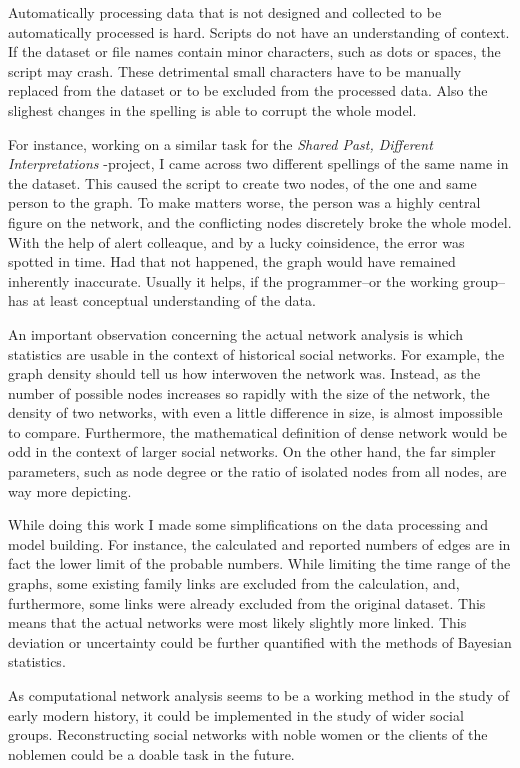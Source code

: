 Automatically processing data that is not designed and collected to be automatically processed is hard. Scripts do not have an understanding of context. If the dataset or file names contain minor characters, such as dots or spaces, the script may crash. These detrimental small characters have to be manually replaced from the dataset or to be excluded from the processed data. Also the slighest changes in the spelling is able to corrupt the whole model.

For instance, working on a similar task for the \textit{Shared Past, Different Interpretations} -project, I came across two different spellings of the same name in the dataset. This caused the script to create two nodes, of the one and same person to the graph. To make matters worse, the person was a highly central figure on the network, and the conflicting nodes discretely broke the whole model. With the help of alert colleaque, and by a lucky coinsidence, the error was spotted in time. Had that not happened, the graph would have remained inherently inaccurate. Usually it helps, if the programmer–or the working group–has at least conceptual understanding of the data. 

An important observation concerning the actual network analysis is which statistics are usable in the context of historical social networks. For example, the graph density should tell us how interwoven the network was. Instead, as the number of possible nodes increases so rapidly with the size of the network, the density of two networks, with even a little difference in size, is almost impossible to compare. Furthermore, the mathematical definition of dense network would be odd in the context of larger social networks. On the other hand, the far simpler parameters, such as node degree or the ratio of isolated nodes from all nodes, are way more depicting. 

While doing this work I made some simplifications on the data processing and model building. For instance, the calculated and reported numbers of edges are in fact the lower limit of the probable numbers. While limiting the time range of the graphs, some existing family links are excluded from the calculation, and, furthermore, some links were already excluded from the original dataset. This means that the actual networks were most likely slightly more linked. This deviation or uncertainty could be further quantified with the methods of Bayesian statistics.
 
As computational network analysis seems to be a working method in the study of early modern history, it could be implemented in the study of wider social groups. Reconstructing social networks with noble women or the clients of the noblemen could be a doable task in the future.

